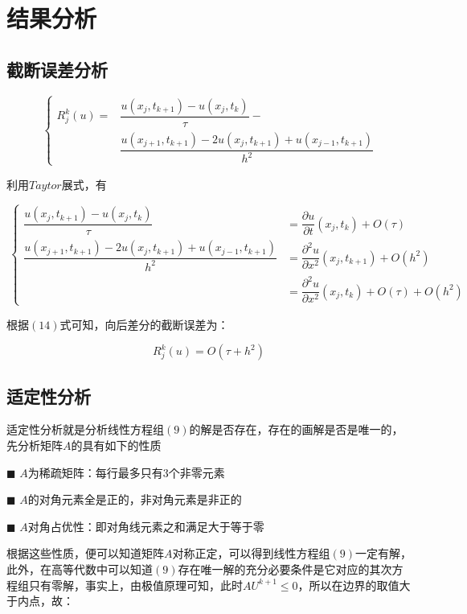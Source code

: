 \documentclass[UTF8]{ctexart}
\begin{document}
\section{结果分析}

\subsection{截断误差分析}

\begin{equation}
\ \left \{
\begin{aligned}
R_j^k(u) ={}& \dfrac{u(x_j,t_{k+1})-u(x_j,t_k)}{\tau}-  \\
& \dfrac{u(x_{j+1},t_{k+1})-2u(x_j,t_{k+1})+u(x_{j-1},t_{k+1})}{h^2}
\end{aligned}
\right.
\end{equation}

利用$Taytor$展式，有

\begin{equation}
\ \left \{
\begin{aligned}
\dfrac{u(x_j,t_{k+1})-u(x_j,t_k)}{\tau} &= \dfrac{\partial u}{\partial t}(x_j,t_k)+O(\tau) \\
\dfrac{u(x_{j+1},t_{k+1})-2u(x_j,t_{k+1})+u(x_{j-1},t_{k+1})}{h^2}&=\dfrac{\partial^2 u}{\partial x^2}(x_j,t_{k+1})+O(h^2) \\
&=\dfrac{\partial^2 u}{\partial x^2}(x_j,t_k)+O(\tau)+O(h^2) 
\end{aligned}
\right.
\end{equation}

根据$(14)$式可知，向后差分的截断误差为：

\begin{equation}
R_j^k(u) = O(\tau+h^2)
\end{equation}

\subsection{适定性分析}

适定性分析就是分析线性方程组$(9)$的解是否存在，存在的画解是否是唯一的，先分析矩阵$A$的具有如下的性质

$\blacksquare$ $A$为稀疏矩阵：每行最多只有3个非零元素

$\blacksquare$ $A$的对角元素全是正的，非对角元素是非正的

$\blacksquare$ $A$对角占优性：即对角线元素之和满足大于等于零

根据这些性质，便可以知道矩阵$A$对称正定，可以得到线性方程组$(9)$一定有解，此外，在高等代数中可以知道$(9)$存在唯一解的充分必要条件是它对应的其次方程组只有零解，事实上，由极值原理可知，此时$AU^{k+1} \leq 0$，所以在边界的取值大于内点，故：
\end{document}
